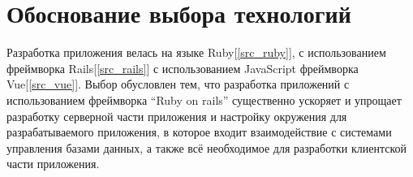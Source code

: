\titleformat{\section}{\large\bfseries}{\thesection}{0.5em}{}
\titlespacing*{\section}{1.1cm}{1ex}{1em}
\titlespacing*{\subsection}{0.6cm}{1ex}{1em}
\section{Обоснование выбора технологий}
{
    Разработка приложения велась на языке Ruby[\ref{src_ruby}], с использованием фреймворка Rails[\ref{src_rails}] с использованием JavaScript фреймворка Vue[\ref{src_vue}]. Выбор обусловлен тем, что разработка приложений с использованием фреймворка \enquote{Ruby on rails} существенно ускоряет и упрощает разработку серверной части приложения и настройку окружения для разрабатываемого приложения, в которое входит взаимодействие с системами управления базами данных, а также всё необходимое для разработки клиентской части приложения.
}
\newpage

